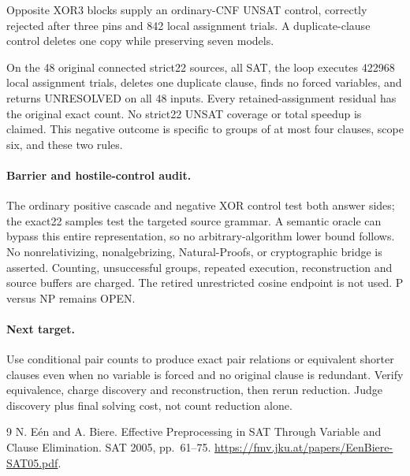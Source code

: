 \documentclass[11pt]{article}
\begin{document}
Opposite XOR3 blocks supply an ordinary-CNF UNSAT control, correctly rejected
after three pins and 842 local assignment trials. A duplicate-clause control
deletes one copy while preserving seven models.

On the 48 original connected strict22 sources, all SAT, the loop executes
422968 local assignment trials, deletes one duplicate clause, finds no
forced variables, and returns UNRESOLVED on all 48 inputs.
Every retained-assignment residual has the original exact count.
No strict22 UNSAT coverage or total speedup is claimed. This negative outcome
is specific to groups of at most four clauses, scope six, and these two rules.

\paragraph{Barrier and hostile-control audit.}
The ordinary positive cascade and negative XOR control test both answer sides;
the exact22 samples test the targeted source grammar. A semantic oracle can
bypass this entire representation, so no arbitrary-algorithm lower bound
follows. No nonrelativizing, nonalgebrizing, Natural-Proofs, or cryptographic
bridge is asserted. Counting, unsuccessful groups, repeated execution,
reconstruction and source buffers are charged. The retired unrestricted
cosine endpoint is not used. P versus NP remains OPEN.

\paragraph{Next target.}
Use conditional pair counts to produce exact pair relations or equivalent
shorter clauses even when no variable is forced and no original clause is
redundant. Verify equivalence, charge discovery and reconstruction, then
rerun reduction. Judge discovery plus final solving cost, not count reduction
alone.

\begin{thebibliography}{9}
 N. E\'en and A. Biere.
Effective Preprocessing in SAT Through Variable and Clause Elimination.
SAT 2005, pp.\ 61--75.
\url{https://fmv.jku.at/papers/EenBiere-SAT05.pdf}.
\end{thebibliography}
\end{document}

